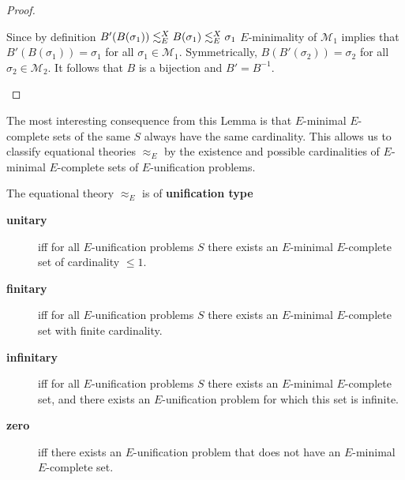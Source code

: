 \begin{proof}
\begin{center}
	\end{center}
	Since by definition $B'(B(\sigma_1))\lesssim^X_E B(\sigma_1)\lesssim^X_E\sigma_1$ $E$-minimality of $\mathcal{M}_1$ implies that $B'(B(\sigma_1))=\sigma_1$ for all $\sigma_1\in\mathcal{M}_1$. Symmetrically, $B(B'(\sigma_2))=\sigma_2$ for all $\sigma_2\in\mathcal{M}_2$. It follows that $B$ is a bijection and $B'=B^{-1}$.
	\begin{center}
	\end{center}
\end{proof}
The most interesting consequence from this Lemma is that $E$-minimal $E$-complete sets of the same $S$ always have the same cardinality. This allows us to classify equational theories $\approx_E$ by the existence and possible cardinalities of $E$-minimal $E$-complete sets of $E$-unification problems.\\
\begin{definition}
	The equational theory $\approx_E$ is of \textbf{unification type}
	\begin{description}
		\item[\textbf{unitary}] iff for all $E$-unification problems $S$ there exists an $E$-minimal $E$-complete set of cardinality $\leq 1$.
		\item[\textbf{finitary}] iff for all $E$-unification problems $S$ there exists an $E$-minimal $E$-complete set with finite cardinality.
		\item[\textbf{infinitary}] iff for all $E$-unification problems $S$ there exists an $E$-minimal $E$-complete set, and there exists an $E$-unification problem for which this set is infinite.
		\item[\textbf{zero}] iff there exists an $E$-unification problem that does not have an $E$-minimal $E$-complete set.
	\end{description}
\end{definition}
